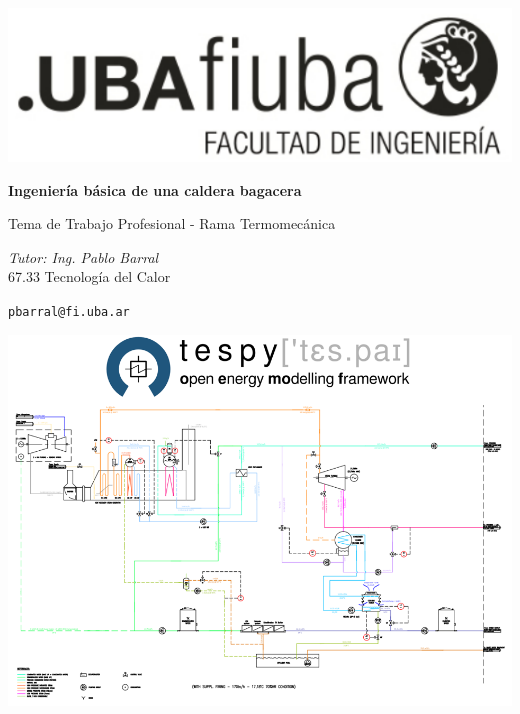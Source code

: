 \documentclass[a4paper]{article}
\begin{document}
\begin{center}

\begin{center}
\includegraphics[scale=0.5]{Logo.PNG} 
\end{center}
\hspace{20pt}

\huge
\textbf{Ingeniería básica de una caldera bagacera}\\ 
\hspace{50pt}

\Large
Tema de Trabajo Profesional - Rama Termomecánica\\ 

\hspace{10pt}

\large
\textit{Tutor: Ing. Pablo Barral}\\

\small
67.33 Tecnología del Calor\\

\hspace{8pt}

\small  
\texttt{pbarral@fi.uba.ar}\\

\end{center}

\hspace{8pt}

\begin{center}
\includegraphics[scale=0.45]{Captura.PNG} 
\end{center}
\hspace{8pt}
\end{document}
